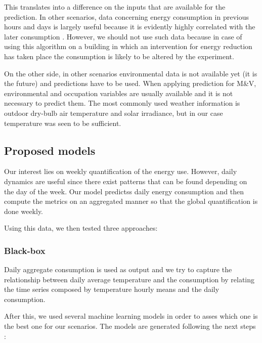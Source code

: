 \documentclass[10pt, conference, compsocconf]{IEEEtran}
\begin{document}
This translates into a difference on the inputs that are available for the prediction. In other scenarios, data concerning energy consumption in previous hours and days is largely useful because it is evidently highly correlated with the later consumption \cite{aman2014empirical}. However, we should not use such data because in case of using this algorithm on a building in which an intervention for energy reduction has taken place the consumption is likely to be altered by the experiment.

On the other side, in other scenarios environmental data is not available yet (it is the future) and predictions have to be used. When applying prediction for M\&V, environmental and occupation variables are usually available and it is not necessary to predict them. The most commonly used weather information is outdoor dry-bulb air temperature and solar irradiance, but in our case temperature was seen to be sufficient.



\subsection{Proposed models}

Our interest lies on weekly quantification of the energy use. However, daily dynamics are useful since there exist patterns that can be found depending on the day of the week. Our model predictss daily energy consumption and then compute the metrics on an aggregated manner so that the global quantification is done weekly.

Using this data, we then tested three approaches:

\subsubsection{Black-box}

Daily aggregate consumption is used as output and we try to capture the relationship between daily average temperature and the consumption by relating the time series composed by temperature hourly means and the daily consumption.

After this, we used several machine learning models in order to asses which one is the best one for our scenarios. The models are generated  following the next steps \cite{gonzalez2016towards}:
\end{document}
